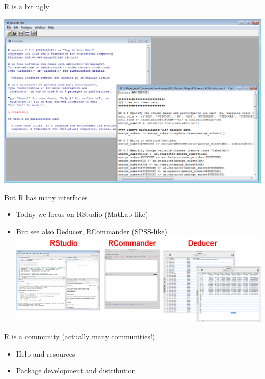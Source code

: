 \documentclass[ignorenonframetext,]{beamer}
\providecommand{\tightlist}{%
  \setlength{\itemsep}{0pt}\setlength{\parskip}{0pt}}
\begin{document}
\begin{frame}{R is a bit ugly}
\protect\hypertarget{r-is-a-bit-ugly}{}

\includegraphics{../external/images/intro_rgui.PNG}

\end{frame}

\begin{frame}{But R has many interfaces}
\protect\hypertarget{but-r-has-many-interfaces}{}

\begin{itemize}
\tightlist
\item
  Today we focus on RStudio (MatLab-like)
\item
  But see also Deducer, RCommander (SPSS-like)
  \includegraphics{../external/images/intro_rgui_2.PNG}
\end{itemize}

\end{frame}

\begin{frame}{R is a community (actually many communities!)}
\protect\hypertarget{r-is-a-community-actually-many-communities}{}

\begin{itemize}
\tightlist
\item
  Help and resources
\item
  Package development and distribution
\end{itemize}

\end{frame}
\end{document}
